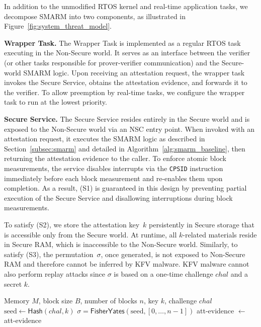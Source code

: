\documentclass{ieeeaccess}
\begin{document}
In addition to the unmodified RTOS kernel and real-time application tasks, we decompose SMARM into two components, as illustrated in Figure~\ref{fig:system_threat_model}.

\textbf{Wrapper Task.}
The Wrapper Task is implemented as a regular RTOS task executing in the Non-Secure world.
It serves as an interface between the verifier (or other tasks responsible for prover-verifier communication) and the Secure-world SMARM logic.
Upon receiving an attestation request, the wrapper task invokes the Secure Service, obtains the attestation evidence, and forwards it to the verifier.
To allow preemption by real-time tasks, we configure the wrapper task to run at the lowest priority.
    
\textbf{Secure Service.}
The Secure Service resides entirely in the Secure world and is exposed to the Non-Secure world via an NSC entry point.
When invoked with an attestation request, it executes the SMARM logic as described in Section~\ref{subsec:smarm} and detailed in Algorithm~\ref{alg:smarm_baseline}, then returning the attestation evidence to the caller.
To enforce atomic block measurements, the service disables interrupts via the \texttt{CPSID} instruction immediately before each block measurement and re-enables them upon completion.
As a result, (S1) is guaranteed in this design by preventing partial execution of the Secure Service and disallowing interruptions during block measurements.
    
To satisfy (S2), we store the attestation key~$k$ persistently in Secure storage that is accessible only from the Secure world.
At runtime, all $k$-related materials reside in Secure RAM, which is inaccessible to the Non-Secure world.
Similarly, to satisfy (S3), the permutation~$\sigma$, once generated, is not exposed to Non-Secure RAM and therefore cannot be inferred by KFV malware.
KFV malware cannot also perform replay attacks since $\sigma$ is based on a one-time challenge $chal$ and a secret $k$.

\begin{algorithm}[t]
\caption{Pseudocode of SMARM Service}
\label{alg:smarm_baseline}
\begin{algorithmic}[1]
\small
\Notation Memory $M$, block size $B$, number of blocks $n$, key $k$, challenge $chal$
\State $\text{seed} \gets \mathsf{Hash}(chal, k)$
\State $\sigma = \mathsf{FisherYates}(\text{seed}, [0,\ldots,n-1])$
\State {}
    \State {}
    \State {}
    \State {}
\EndFor
\State att-evidence $\gets$ 
\Output att-evidence
\end{algorithmic}
\end{algorithm}
\end{document}
